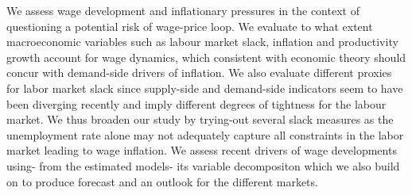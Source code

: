 \quad We assess wage development and inflationary pressures in the context of questioning a potential risk of wage-price loop. We evaluate to what extent macroeconomic variables such as labour market slack, inflation and productivity growth account for wage dynamics, which consistent with economic theory should concur with demand-side drivers of inflation. We also evaluate different proxies for labor market slack since supply-side and demand-side indicators seem to have been diverging recently and imply different degrees of tightness for the labour market. We thus broaden our study by trying-out several slack measures as the unemployment rate alone may not adequately capture all constraints in the labor market leading to wage inflation. We assess recent drivers of wage developments using- from the estimated models- its variable decompositon which we also build on to produce forecast and an outlook for the different markets.